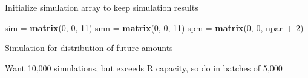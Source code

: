 \documentclass[]{article}
\newenvironment{Shaded}{\begin{snugshade}}{\end{snugshade}}
\newcommand{\DecValTok}[1]{\textcolor[rgb]{0.00,0.00,0.81}{#1}}
\newcommand{\KeywordTok}[1]{\textcolor[rgb]{0.13,0.29,0.53}{\textbf{#1}}}
\newcommand{\NormalTok}[1]{#1}
\newcommand{\OperatorTok}[1]{\textcolor[rgb]{0.81,0.36,0.00}{\textbf{#1}}}
\newcommand{\StringTok}[1]{\textcolor[rgb]{0.31,0.60,0.02}{#1}}
\begin{document}
Initialize simulation array to keep simulation results

\begin{Shaded}
\begin{Highlighting}[]
\NormalTok{sim =}\StringTok{ }\KeywordTok{matrix}\NormalTok{(}\DecValTok{0}\NormalTok{, }\DecValTok{0}\NormalTok{, }\DecValTok{11}\NormalTok{)}
\NormalTok{smn =}\StringTok{ }\KeywordTok{matrix}\NormalTok{(}\DecValTok{0}\NormalTok{, }\DecValTok{0}\NormalTok{, }\DecValTok{11}\NormalTok{)}
\NormalTok{spm =}\StringTok{ }\KeywordTok{matrix}\NormalTok{(}\DecValTok{0}\NormalTok{, }\DecValTok{0}\NormalTok{, npar }\OperatorTok{+}\StringTok{ }\DecValTok{2}\NormalTok{)}
\end{Highlighting}
\end{Shaded}

Simulation for distribution of future amounts

Want 10,000 simulations, but exceeds R capacity, so do in batches of
5,000
\end{document}
